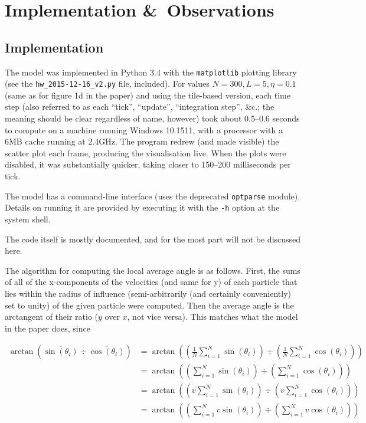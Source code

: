 \documentclass{article}
\begin{document}
\section{Implementation \&\ Observations} %
\subsection{Implementation}

The model was implemented in Python 3.4 with the \verb|matplotlib| plotting
library (see the \verb|hw_2015-12-16_v2.py| file, included).  For values $N=300,
L=5, \eta=0.1$ (same as for figure 1d in the paper) and using the tile-based
version, each time step (also referred to as each ``tick'', ``update'',
``integration step'', \&c.; the meaning should be clear regardless of name,
however) took about 0.5--0.6 seconds to compute on a machine running Windows
10.1511, with a processor with a 6MB cache running at 2.4GHz.  The program
redrew (and made visible) the scatter plot each frame, producing the
visualisation live.  When the plots were disabled, it was substantially quicker,
taking closer to 150--200 milliseconds per tick.


The model has a command-line interface (uses the deprecated \verb|optparse|
module).  Details on running it are provided by executing it with the \verb|-h|
option at the system shell.


The code itself is mostly documented, and for the most part will not be
discussed here.


The algorithm for computing the local average angle is as follows.  First, the
sums of all of the x-components of the velocities (and same for y) of each
particle that lies within the radius of influence (semi-arbitrarily (and
certainly conveniently) set to unity) of the given particle were computed.  Then
the average angle is the arctangent of their ratio ($y$ over $x$, not vice
versa).  This matches what the model in the paper does, since

\begin{equation*}
  \begin{array}{rl}
    \arctan(\overline{\sin(\theta_i)} \div \overline{\cos(\theta_i)})
    &=
    \arctan((\frac{1}{N}\sum_{i=1}^N\sin(\theta_i)) \div (\frac{1}{N}\sum_{i=1}^N\cos(\theta_i)))\\
    &=
    \arctan((\sum_{i=1}^N\sin(\theta_i)) \div (\sum_{i=1}^N\cos(\theta_i)))\\
    &=
    \arctan((v\sum_{i=1}^N\sin(\theta_i)) \div (v\sum_{i=1}^N\cos(\theta_i)))\\
    &=
    \arctan((\sum_{i=1}^N v\sin(\theta_i)) \div (\sum_{i=1}^N v\cos(\theta_i)))
  \end{array}
\end{equation*}
\end{document}
